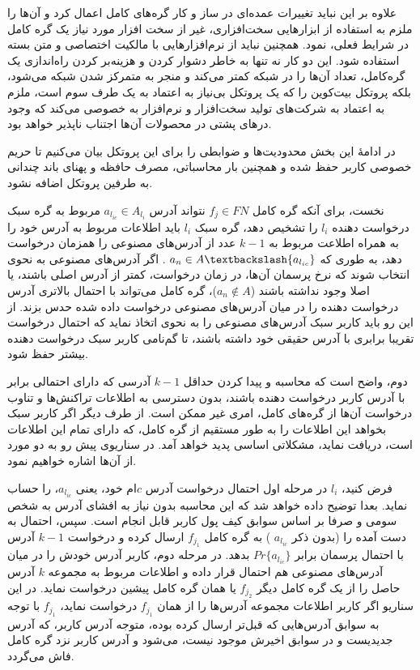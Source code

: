 علاوه بر این نباید تغییرات عمده‌ای در ساز و کار گره‌های کامل اعمال کرد و آن‌ها را ملزم به استفاده از ابزارهایی سخت‌افزاری، غیر از سخت افزار مورد نیاز یک گره کامل در شرایط فعلی، نمود. همچنین نباید از نرم‌افزارهایی با مالکیت اختصاصی و متن بسته استفاده شود. این دو کار نه تنها به خاطر دشوار کردن و هزینه‌بر کردن راه‌اندازی یک گره‌کامل، تعداد آن‌ها را در شبکه کمتر می‌کند و منجر به متمرکز شدن شبکه می‌شود، بلکه پروتکل بیت‌کوین را که یک پروتکل بی‌نیاز به اعتماد به یک طرف سوم است، ملزم به اعتماد به شرکت‌های تولید سخت‌افزار‌ و نرم‌افزار‌ به خصوصی می‌کند که وجود درهای پشتی در محصولات آن‌ها اجتناب ناپذیر خواهد بود. 

در ادامهٔ این بخش محدودیت‌ها و  ضوابطی را برای این پروتکل بیان می‌کنیم تا حریم خصوصی کاربر حفظ شده و  همچنین بار محاسباتی، مصرف حافظه و پهنای باند چندانی به طرفین پروتکل اضافه نشود.

نخست، برای آنکه گره کامل $f_j \in FN$ نتواند آدرس $a_{l_{ic}} \in A_{l_i}$ مربوط به گره سبک درخواست دهنده $l_i$ را تشخیص دهد، گره سبک $l_i$ باید اطلاعات مربوط به آدرس خود را به همراه اطلاعت مربوط به $k-1$ عدد از آدرس‌های مصنوعی را همزمان درخواست دهد، به طوری که
$ a_n \in A \textbackslash \{a_{l_{ic}}\}$
. اگر آدرس‌های مصنوعی به نحوی انتخاب شوند که نرخ پرسمان آن‌ها، در زمان درخواست، کمتر از آدرس اصلی باشند، یا اصلا وجود نداشته باشند
($a_n \notin A$)،
گره کامل می‌تواند با احتمال بالاتری آدرس درخواست دهنده را در میان آدرس‌های مصنوعی درخواست داده شده حدس بزند. از این رو باید کاربر سبک آدرس‌های مصنوعی را به نحوی اتخاذ نماید که احتمال درخواست تقریبا برابری با آدرس حقیقی خود داشته باشند، تا گم‌نامی کاربر سبک درخواست دهنده بیشتر حفظ ‌شود. 

دوم، واضح است که محاسبه و پیدا کردن حداقل $k-1$ آدرسی که دارای احتمالی برابر با آدرس کاربر درخواست دهنده باشند، بدون دسترسی به اطلاعات تراکنش‌ها و تناوب درخواست‌ آن‌ها از گره‌های کامل، امری غیر ممکن است. از طرف دیگر اگر کاربر سبک بخواهد این اطلاعات را به طور مستقیم از گره کامل، که دارای تمام این اطلاعات است، دریافت نماید، مشکلاتی اساسی پدید خواهد آمد. در سناریوی پیش رو به دو مورد از آن‌ها اشاره خواهیم نمود.

فرض کنید، $l_i$ در مرحله اول احتمال درخواست آدرس $c$ام خود، یعنی $a_{l_{ic}}$، را حساب نماید. بعدا توضیح داده خواهد شد که این محاسبه بدون نیاز به افشای آدرس به شخص سومی و صرفا بر اساس سوابق کیف پول کاربر قابل انجام است. سپس، احتمال به دست آمده را (بدون ذکر
$a_{l_{ic}}$
) به گره کامل 
$f_{j_1}$
ارسال کرده و  درخواست $k-1$ آدرس با احتمال پرسمان برابر
$Pr\{{a_{l_{ic}}}\}$
بدهد. در مرحله دوم، کاربر آدرس خودش را در میان آدرس‌های مصنوعی هم احتمال قرار داده و اطلاعات مربوط به مجموعه $k$ آدرس حاصل را از یک گره کامل دیگر $f_{j_2}$ یا همان گره کامل پیشین درخواست نماید.  در این سناریو اگر کاربر اطلاعات مجموعه آدرس‌ها را از همان $f_{j_1}$ درخواست نماید، $f_{j_1}$ با توجه به سوابق آدرس‌هایی که قبل‌تر ارسال کرده بوده، متوجه آدرس کاربر، که آدرس جدیدیست و در سوابق اخیرش موجود نیست، می‌شود و آدرس کاربر نزد گره کامل فاش می‌گردد. 

